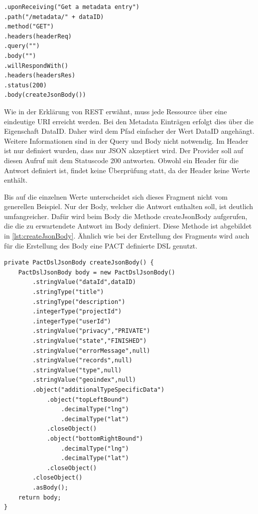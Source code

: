 \documentclass{llncs}
\begin{document}
\lstset{language = Java}
\begin{lstlisting}[caption=Test,label=lst:getCreateFragment]
.uponReceiving("Get a metadata entry")
.path("/metadata/" + dataID)
.method("GET")
.headers(headerReq)
.query("")
.body("")
.willRespondWith()
.headers(headersRes)
.status(200)
.body(createJsonBody())
\end{lstlisting}

Wie in der Erklärung von REST erwähnt, muss jede Ressource über eine eindeutige URI erreicht werden. Bei den Metadata Einträgen erfolgt dies über die Eigenschaft DataID. Daher wird dem Pfad einfacher der Wert DataID angehängt. Weitere Informationen sind in der Query und Body nicht notwendig. Im Header ist nur definiert wurden, dass nur JSON akzeptiert wird.
Der Provider soll auf diesen Aufruf mit dem Statuscode 200 antworten. Obwohl ein Header für die Antwort definiert ist, findet keine Überprüfung statt, da der Header keine Werte enthält. 

Bis auf die einzelnen Werte unterscheidet sich dieses Fragment nicht vom generellen Beispiel. Nur der Body, welcher die Antwort enthalten soll, ist deutlich umfangreicher. Dafür wird beim Body die Methode createJsonBody aufgerufen, die die zu erwartendete Antwort im Body definiert. Diese Methode ist abgebildet in \ref{lst:createJsonBody}. Ähnlich wie bei der Erstellung des Fragments wird auch für die Erstellung des Body eine PACT definierte DSL genutzt.

\lstset{language = Java}
\begin{lstlisting}[caption=Test,label={lst:createJsonBody}]
private PactDslJsonBody createJsonBody() {
    PactDslJsonBody body = new PactDslJsonBody()
        .stringValue("dataId",dataID)
        .stringType("title")
        .stringType("description")
        .integerType("projectId")
        .integerType("userId")
        .stringValue("privacy","PRIVATE")
        .stringValue("state","FINISHED")
        .stringValue("errorMessage",null)
        .stringValue("records",null)
        .stringValue("type",null)
        .stringValue("geoindex",null)
        .object("additionalTypeSpecificData")
            .object("topLeftBound")
                .decimalType("lng")
                .decimalType("lat")
            .closeObject()
            .object("bottomRightBound")
                .decimalType("lng")
                .decimalType("lat")
            .closeObject()
        .closeObject()
        .asBody();
    return body;
}
\end{lstlisting}
\end{document}
